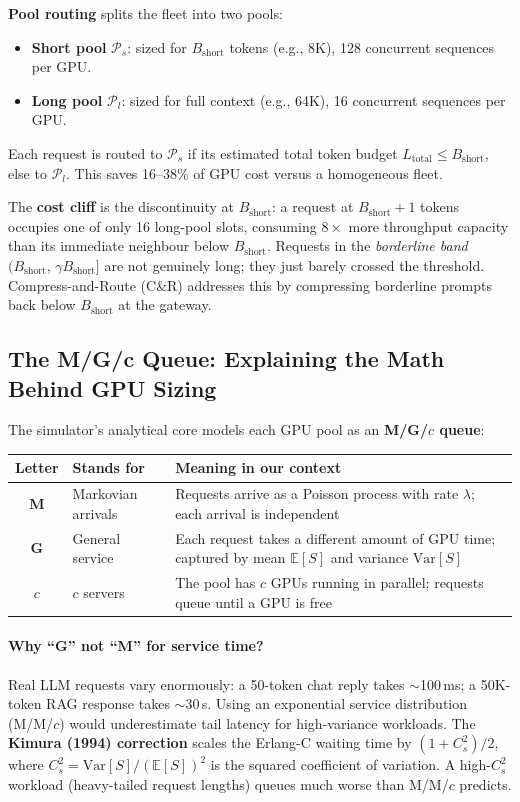 \documentclass[11pt,a4paper]{article}
\newcommand{\Bshort}{B_{\text{short}}}
\newcommand{\Ps}{\mathcal{P}_s}
\newcommand{\Pl}{\mathcal{P}_l}
\begin{document}
\textbf{Pool routing} splits the fleet into two pools:
\begin{itemize}[nosep]
  \item \textbf{Short pool} $\Ps$: sized for $\Bshort$ tokens (e.g., 8K),
    128 concurrent sequences per GPU.
  \item \textbf{Long pool} $\Pl$: sized for full context (e.g., 64K),
    16 concurrent sequences per GPU.
\end{itemize}
Each request is routed to $\Ps$ if its estimated total token budget
$L_{\text{total}} \leq \Bshort$, else to $\Pl$.  This saves 16--38\%
of GPU cost versus a homogeneous fleet.

The \textbf{cost cliff} is the discontinuity at $\Bshort$: a request
at $\Bshort + 1$ tokens occupies one of only 16 long-pool slots,
consuming $8\times$ more throughput capacity than its immediate
neighbour below $\Bshort$.  Requests in the \emph{borderline band}
$(\Bshort,\, \gamma\Bshort]$ are not genuinely long; they just barely
crossed the threshold.  Compress-and-Route (C\&R) addresses this by
compressing borderline prompts back below $\Bshort$ at the gateway.

\subsection{The M/G/c Queue: Explaining the Math Behind GPU Sizing}
\label{sec:mgc}

The simulator's analytical core models each GPU pool as an
\textbf{M/G/$c$ queue}:

\begin{center}
\begin{tabular}{clp{9cm}}
\toprule
Letter & Stands for & Meaning in our context \\
\midrule
\textbf{M} & Markovian arrivals & Requests arrive as a Poisson process with
  rate $\lambda$; each arrival is independent \\
\textbf{G} & General service & Each request takes a different amount of GPU time;
  captured by mean $\mathbb{E}[S]$ and variance $\mathrm{Var}[S]$ \\
\textbf{$c$} & $c$ servers & The pool has $c$ GPUs running in parallel;
  requests queue until a GPU is free \\
\bottomrule
\end{tabular}
\end{center}

\paragraph{Why ``G'' not ``M'' for service time?}
Real LLM requests vary enormously: a 50-token chat reply takes
$\sim$100\,ms; a 50K-token RAG response takes $\sim$30\,s.  Using an
exponential service distribution (M/M/$c$) would underestimate tail
latency for high-variance workloads.  The \textbf{Kimura (1994)
correction} scales the Erlang-C waiting time by $(1 + C_s^2)/2$,
where $C_s^2 = \mathrm{Var}[S]/(\mathbb{E}[S])^2$ is the squared
coefficient of variation.  A high-$C_s^2$ workload (heavy-tailed
request lengths) queues much worse than M/M/$c$ predicts.
\end{document}
